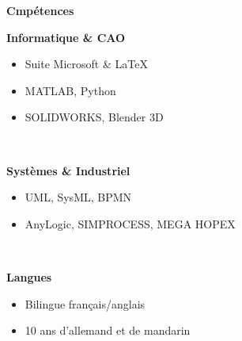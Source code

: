 \documentclass[10pt]{article}
\newcommand{\cvsec}[1]{{\Large\makebox[3cm][l]{\rule{3cm}{0.4pt}} \textbf{#1} \hrulefill\\[6pt]}}
\begin{document}
\cvsec{Cmpétences}
\begin{minipage}[t]{0.32\linewidth}
    {\large\textbf{Informatique \& CAO}}
    \begin{itemize}[leftmargin=*]
        \item Suite Microsoft \& \LaTeX\
        \item MATLAB, Python
        \item SOLIDWORKS, Blender 3D
    \end{itemize}
\end{minipage}
~
\begin{minipage}[t]{0.32\linewidth}
    {\large\textbf{Systèmes \& Industriel}}
    \begin{itemize}[leftmargin=*]
        \item UML, SysML, BPMN
        \item AnyLogic, SIMPROCESS, MEGA HOPEX
    \end{itemize}
\end{minipage}
~
\begin{minipage}[t]{0.32\linewidth}
    {\large\textbf{Langues}}
    \begin{itemize}[leftmargin=*]
        \item Bilingue français/anglais
        \item 10 ans d'allemand et de mandarin
    \end{itemize}
\end{minipage}
\end{document}
